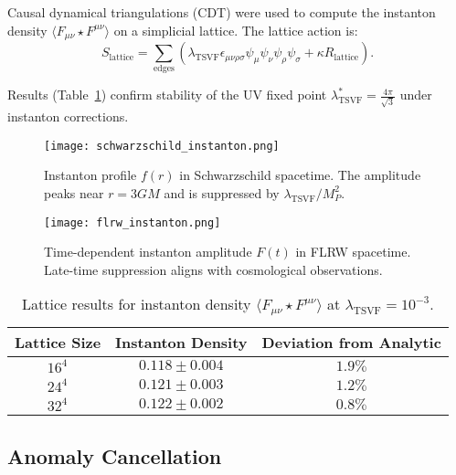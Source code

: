 \documentclass[12pt, onecolumn]{article}
\theoremstyle{definition}
\numberwithin{equation}{section}
\begin{document}
\begin{appendices}
Causal dynamical triangulations (CDT) were used to compute the instanton density $\langle F_{\mu\nu} \star F^{\mu\nu} \rangle$ on a simplicial lattice. The lattice action is:
\begin{equation}
    S_{\text{lattice}} = \sum_{\text{edges}} \left( \lambda_{\text{TSVF}} \epsilon_{\mu\nu\rho\sigma} \psi_\mu \psi_\nu \psi_\rho \psi_\sigma + \kappa R_{\text{lattice}} \right). \label{eq:lattice_action}
\end{equation}

Results (Table~\ref{tab:lattice_results}) confirm stability of the UV fixed point $\lambda_{\text{TSVF}}^* = \frac{4\pi}{\sqrt{3}}$ under instanton corrections.

\begin{figure}[htbp]
    \centering
    \texttt{[image: schwarzschild\_instanton.png]}
    \caption{Instanton profile $f(r)$ in Schwarzschild spacetime. The amplitude peaks near $r = 3GM$ and is suppressed by $\lambda_{\text{TSVF}}/M_P^2$.}
    \label{fig:schwarzschild_instanton}
\end{figure}

\begin{figure}[htbp]
    \centering
    \texttt{[image: flrw\_instanton.png]}
    \caption{Time-dependent instanton amplitude $F(t)$ in FLRW spacetime. Late-time suppression aligns with cosmological observations.}
    \label{fig:flrw_instanton}
\end{figure}

\begin{table}[htbp]
    \centering
    \caption{Lattice results for instanton density $\langle F_{\mu\nu} \star F^{\mu\nu} \rangle$ at $\lambda_{\text{TSVF}} = 10^{-3}$.}
    \label{tab:lattice_results}
    \begin{tabular}{@{}ccc@{}}
        \toprule
        Lattice Size & Instanton Density & Deviation from Analytic \\
        \midrule
        $16^4$ & $0.118 \pm 0.004$ & $1.9\%$ \\
        $24^4$ & $0.121 \pm 0.003$ & $1.2\%$ \\
        $32^4$ & $0.122 \pm 0.002$ & $0.8\%$ \\
        \bottomrule
    \end{tabular}
\end{table}

\subsection{Anomaly Cancellation}
\label{subsec:anomaly}


\end{appendices}
\end{document}
